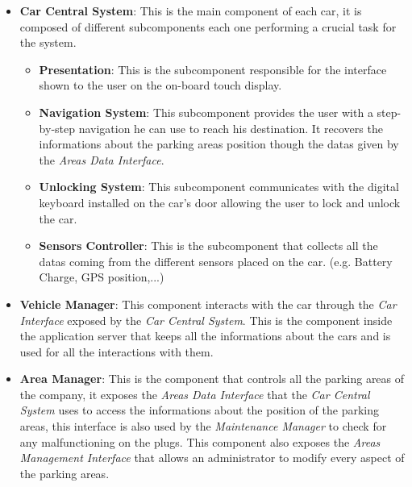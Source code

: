 \begin{itemize}
	\item \textbf{Car Central System}: This is the main component of each car,
																		 it is composed of different subcomponents
																		 each one performing a crucial task for the
																		 system.

	\begin{itemize}
	\item \textbf{Presentation}: This is the subcomponent responsible for the
															 interface shown to the user on the on-board touch
															 display.
	\item \textbf{Navigation System}: This subcomponent provides the user with a
																		step-by-step navigation he can use to reach
																		his destination. It recovers the
																		informations about the parking areas
																		position though the datas given by the
																		\textit{Areas Data Interface}.
	\item \textbf{Unlocking System}: This subcomponent communicates with the
																	 digital keyboard installed on the car's door
																	 allowing the user to lock and unlock the car.
	\item \textbf{Sensors Controller}: This is the subcomponent that collects all
																		 the datas coming from the different sensors
																		 placed on the car. (e.g. Battery Charge, GPS
																		 position,...)

	\end{itemize}

	\item \textbf{Vehicle Manager}: This component interacts with the car through
																	the \textit{Car Interface} exposed by the
																	\textit{Car Central System}. This is the
																	component inside the application server that
																	keeps all the informations about the cars and
																	is used for all the interactions with them.
	\item \textbf{Area Manager}: This is the component that controls all the
															 parking areas of the company, it exposes the
															 \textit{Areas Data Interface} that the
															 \textit{Car Central System} uses to access the
															 informations about the position of the parking
															 areas, this interface is also used by the
															 \textit{Maintenance Manager} to check for any
															 malfunctioning on the plugs. This component also
															 exposes the \textit{Areas Management Interface}
															 that allows an administrator to modify every
															 aspect of the parking areas.
\end{itemize}


